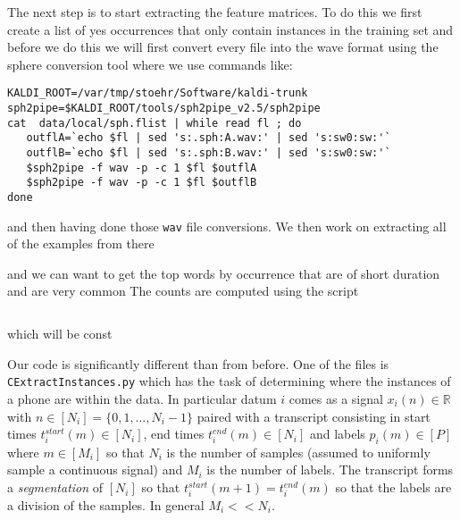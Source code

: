 \documentclass{article}
\begin{document}
The next step is to start extracting the feature matrices. To do
this we first create a list of yes occurrences that only
contain instances in the training set and before we do this we will
first convert every file into the wave format using the
sphere conversion tool where we use commands like:
\begin{verbatim}
KALDI_ROOT=/var/tmp/stoehr/Software/kaldi-trunk
sph2pipe=$KALDI_ROOT/tools/sph2pipe_v2.5/sph2pipe
cat  data/local/sph.flist | while read fl ; do
   outflA=`echo $fl | sed 's:.sph:A.wav:' | sed 's:sw0:sw:'`
   outflB=`echo $fl | sed 's:.sph:B.wav:' | sed 's:sw0:sw:'`
   $sph2pipe -f wav -p -c 1 $fl $outflA
   $sph2pipe -f wav -p -c 1 $fl $outflB
done
\end{verbatim}
and then having done those \texttt{wav} file conversions. We
then work on extracting all of the examples from there

and we can 
want to get the top words by occurrence that are
of short duration and are very common
 The counts are computed
using the script
\begin{verbatim}

\end{verbatim}
which will be const


Our code is significantly different than from before.  One of the files is \texttt{CExtractInstances.py}
which has the task of determining where the instances of a phone are within the data. In particular datum $i$ comes as 
a signal $x_i(n)\in\mathbb{R}$ with $n\in[N_i]=\{0,1,\ldots,N_i-1\}$ paired with a transcript consisting in start times $t_i^{start}(m)\in[N_i]$,
end times $t_i^{end}(m)\in[N_i]$ and labels $p_i(m)\in [P]$ where $m\in[M_i]$ so that $N_i$ is the number of samples (assumed to 
uniformly sample a continuous signal) and $M_i$ is the number of labels.  The transcript forms a \textit{segmentation} of
$[N_i]$ so that $t_i^{start}(m+1)=t_i^{end}(m)$ so that the labels are a division of the samples.  In general $M_i << N_i$.
\end{document}

